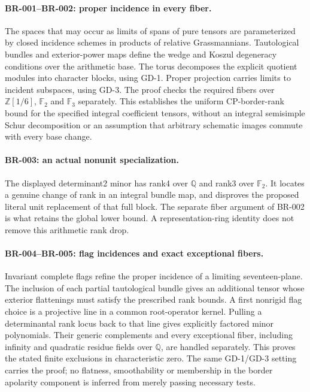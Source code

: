 \paragraph{BR-001--BR-002: proper incidence in every fiber.}
The spaces that may occur as limits of spans of pure tensors are
parameterized by closed incidence schemes in products of relative
Grassmannians. Tautological bundles and exterior-power maps define
the wedge and Koszul degeneracy conditions over the arithmetic base.
The torus decomposes the explicit quotient modules into character
blocks, using GD-1. Proper projection carries limits to incident
subspaces, using GD-3. The proof checks the required fibers over
$\mathbb Z[1/6]$, $\mathbb F_2$ and $\mathbb F_3$ separately.
This establishes the uniform CP-border-rank bound for the specified
integral coefficient tensors, without an integral semisimple Schur
decomposition or an assumption that arbitrary schematic images commute
with every base change.

\paragraph{BR-003: an actual nonunit specialization.}
The displayed determinant2 minor has rank4 over $\mathbb Q$ and rank3
over $\mathbb F_2$. It locates a genuine change of rank in an integral
bundle map, and disproves the proposed literal unit replacement of
that full block. The separate fiber argument of BR-002 is what retains
the global lower bound. A representation-ring identity does not remove
this arithmetic rank drop.

\paragraph{BR-004--BR-005: flag incidences and exact exceptional fibers.}
Invariant complete flags refine the proper incidence of a limiting
seventeen-plane. The inclusion of each partial tautological bundle
gives an additional tensor whose exterior flattenings must satisfy
the prescribed rank bounds. A first nonrigid flag choice is a
projective line in a common root-operator kernel. Pulling a
determinantal rank locus back to that line gives explicitly factored
minor polynomials. Their generic complements and every exceptional
fiber, including infinity and quadratic residue fields over
$\mathbb Q$, are handled separately. This proves the stated finite
exclusions in characteristic zero. The same GD-1/GD-3 setting carries
the proof; no flatness, smoothability or membership in the border
apolarity component is inferred from merely passing necessary tests.

